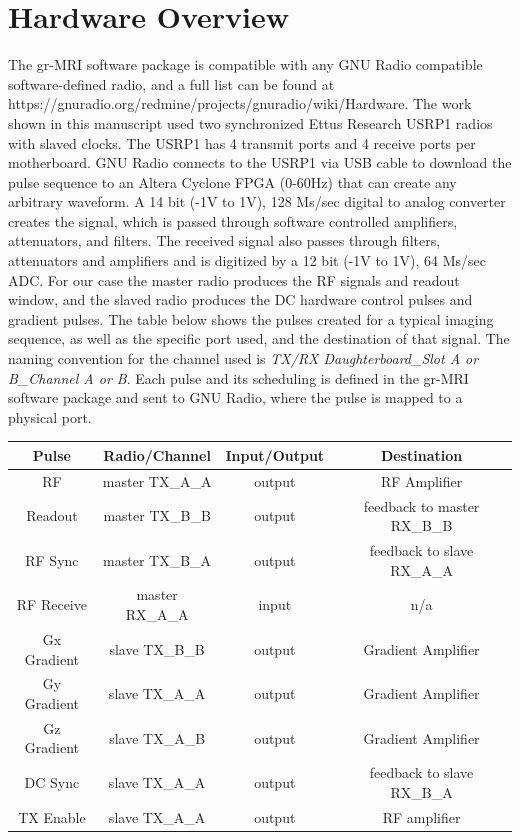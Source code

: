 \documentclass[review]{elsarticle}
\begin{document}

\section{Hardware Overview}\label{Hardware Overvew}

\indent The gr-MRI software package is compatible with any GNU Radio compatible software-defined radio, and a full list can be found at https://gnuradio.org/redmine/projects/gnuradio/wiki/Hardware.  The work shown in this manuscript used two synchronized Ettus Research USRP1 radios with slaved clocks.  The USRP1 has 4 transmit ports and 4 receive ports per motherboard.  GNU Radio connects to the USRP1 via USB cable to download the pulse sequence to an Altera Cyclone FPGA (0-60Hz) that can create any arbitrary waveform.   A 14 bit (-1V to 1V), 128 Ms/sec digital to analog converter creates the signal, which is passed through software controlled amplifiers, attenuators, and filters.  The received signal also passes through filters, attenuators and amplifiers and is digitized by a 12 bit (-1V to 1V), 64 Ms/sec ADC.  For our case the master radio produces the RF signals and readout window, and the slaved radio produces the DC hardware control pulses and gradient pulses.  The table below shows the pulses created for a typical imaging sequence, as well as the specific port used, and the destination of that signal.  The naming convention for the channel used is \textit{TX/RX Daughterboard\_Slot A or B\_Channel A or B}. Each pulse and its scheduling is defined in the gr-MRI software package and sent to GNU Radio, where the pulse is mapped to a physical port.

\begin{center}
\begin{tabular}[c]{| c | c | c | c |}
	\hline
	\textbf{Pulse} & \textbf{Radio/Channel} & \textbf{Input/Output} & \textbf{Destination} \\ \hline
	RF  & master TX\_A\_A & output & RF Amplifier\\ \hline
	Readout & master TX\_B\_B & output & feedback to master RX\_B\_B\\ \hline
	RF Sync & master TX\_B\_A & output & feedback to slave RX\_A\_A\\ \hline
	RF Receive & master RX\_A\_A & input & n/a\\ \hline
	Gx Gradient & slave TX\_B\_B & output & Gradient Amplifier\\ \hline
	Gy Gradient & slave TX\_A\_A & output & Gradient Amplifier\\ \hline
	Gz Gradient & slave TX\_A\_B & output & Gradient Amplifier\\ \hline
	DC Sync & slave TX\_A\_A & output & feedback to slave RX\_B\_A\\ \hline
	TX Enable & slave TX\_A\_A & output & RF amplifier\\ \hline
\end{tabular}
\end{center}
\end{document}
